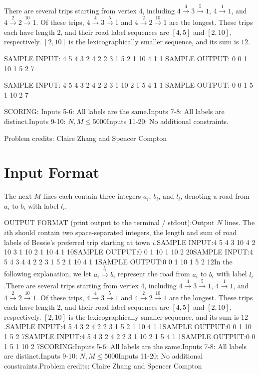 \documentclass[12pt]{article}
\begin{document}
There are several trips starting from vertex $4$, including
$4 \overset{4}\to 3\overset{5}\to 1$, $4\overset{1}\to 1$, and
$4\overset{2}\to 2\overset{10}\to 1$. Of these trips,
$4 \overset{4}\to 3\overset{5}\to 1$ and $4\overset{2}\to 2\overset{10}\to 1$
are the longest. These trips each have length 2, and their road label sequences
are $[4,5]$ and $[2,10]$, respectively. $[2,10]$ is the lexicographically
smaller sequence, and its sum is $12$.

SAMPLE INPUT:
4 5
4 3 2
4 2 2
3 1 5
2 1 10
4 1 1
SAMPLE OUTPUT: 
0 0
1 10
1 5
2 7

SAMPLE INPUT:
4 5
4 3 2
4 2 2
3 1 10
2 1 5
4 1 1
SAMPLE OUTPUT: 
0 0
1 5
1 10
2 7

SCORING:
Inputs 5-6: All labels are the same.Inputs 7-8: All labels are distinct.Inputs 9-10: $N,M\le 5000$Inputs 11-20: No additional constraints.


Problem credits: Claire Zhang and Spencer Compton



\section*{Input Format}
The next $M$ lines each contain three integers $a_i$, $b_i$, and $l_i$, denoting
a road from $a_i$ to $b_i$ with label $l_i$.

OUTPUT FORMAT (print output to the terminal / stdout):Output $N$ lines. The $i$th should contain two space-separated integers, the
length and sum of road labels of Bessie's preferred trip starting at town
$i$.SAMPLE INPUT:4 5
4 3 10
4 2 10
3 1 10
2 1 10
4 1 10SAMPLE OUTPUT:0 0
1 10
1 10
2 20SAMPLE INPUT:4 5
4 3 4
4 2 2
3 1 5
2 1 10
4 1 1SAMPLE OUTPUT:0 0
1 10
1 5
2 12In the following explanation, we let $a_i\overset{l_i}\to b_i$ represent the
road from $a_i$ to $b_i$ with label $l_i$.There are several trips starting from vertex $4$, including
$4 \overset{4}\to 3\overset{5}\to 1$, $4\overset{1}\to 1$, and
$4\overset{2}\to 2\overset{10}\to 1$. Of these trips,
$4 \overset{4}\to 3\overset{5}\to 1$ and $4\overset{2}\to 2\overset{10}\to 1$
are the longest. These trips each have length 2, and their road label sequences
are $[4,5]$ and $[2,10]$, respectively. $[2,10]$ is the lexicographically
smaller sequence, and its sum is $12$.SAMPLE INPUT:4 5
4 3 2
4 2 2
3 1 5
2 1 10
4 1 1SAMPLE OUTPUT:0 0
1 10
1 5
2 7SAMPLE INPUT:4 5
4 3 2
4 2 2
3 1 10
2 1 5
4 1 1SAMPLE OUTPUT:0 0
1 5
1 10
2 7SCORING:Inputs 5-6: All labels are the same.Inputs 7-8: All labels are distinct.Inputs 9-10: $N,M\le 5000$Inputs 11-20: No additional constraints.Problem credits: Claire Zhang and Spencer Compton
\end{document}
